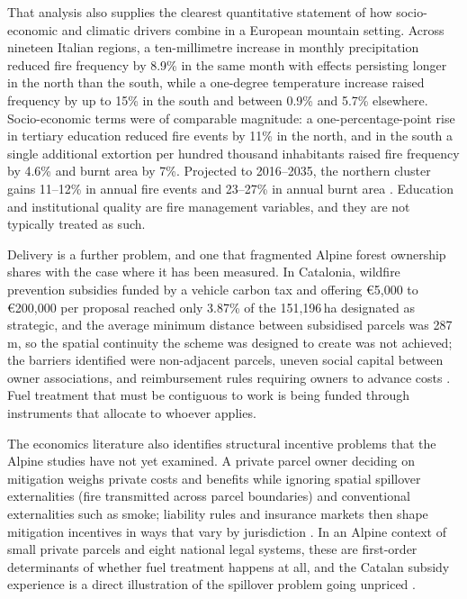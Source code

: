 \documentclass[11pt,a4paper]{article}
\begin{document}
That analysis also supplies the clearest quantitative statement of how socio-economic and climatic drivers combine in a European mountain setting. Across nineteen Italian regions, a ten-millimetre increase in monthly precipitation reduced fire frequency by 8.9\% in the same month with effects persisting longer in the north than the south, while a one-degree temperature increase raised frequency by up to 15\% in the south and between 0.9\% and 5.7\% elsewhere. Socio-economic terms were of comparable magnitude: a one-percentage-point rise in tertiary education reduced fire events by 11\% in the north, and in the south a single additional extortion per hundred thousand inhabitants raised fire frequency by 4.6\% and burnt area by 7\%. Projected to 2016--2035, the northern cluster gains 11--12\% in annual fire events and 23--27\% in annual burnt area \citep{michetti_forest_2019}. Education and institutional quality are fire management variables, and they are not typically treated as such.

Delivery is a further problem, and one that fragmented Alpine forest ownership shares with the case where it has been measured. In Catalonia, wildfire prevention subsidies funded by a vehicle carbon tax and offering €5{,}000 to €200{,}000 per proposal reached only 3.87\% of the 151{,}196\,ha designated as strategic, and the average minimum distance between subsidised parcels was 287\,m, so the spatial continuity the scheme was designed to create was not achieved; the barriers identified were non-adjacent parcels, uneven social capital between owner associations, and reimbursement rules requiring owners to advance costs \citep{gorrizmifsud_current_2026}. Fuel treatment that must be contiguous to work is being funded through instruments that allocate to whoever applies.

The economics literature also identifies structural incentive problems that the Alpine studies have not yet examined. A private parcel owner deciding on mitigation weighs private costs and benefits while ignoring spatial spillover externalities (fire transmitted across parcel boundaries) and conventional externalities such as smoke; liability rules and insurance markets then shape mitigation incentives in ways that vary by jurisdiction \citep{bayham_economics_2022}. In an Alpine context of small private parcels and eight national legal systems, these are first-order determinants of whether fuel treatment happens at all, and the Catalan subsidy experience is a direct illustration of the spillover problem going unpriced \citep{gorrizmifsud_current_2026}.
\end{document}
